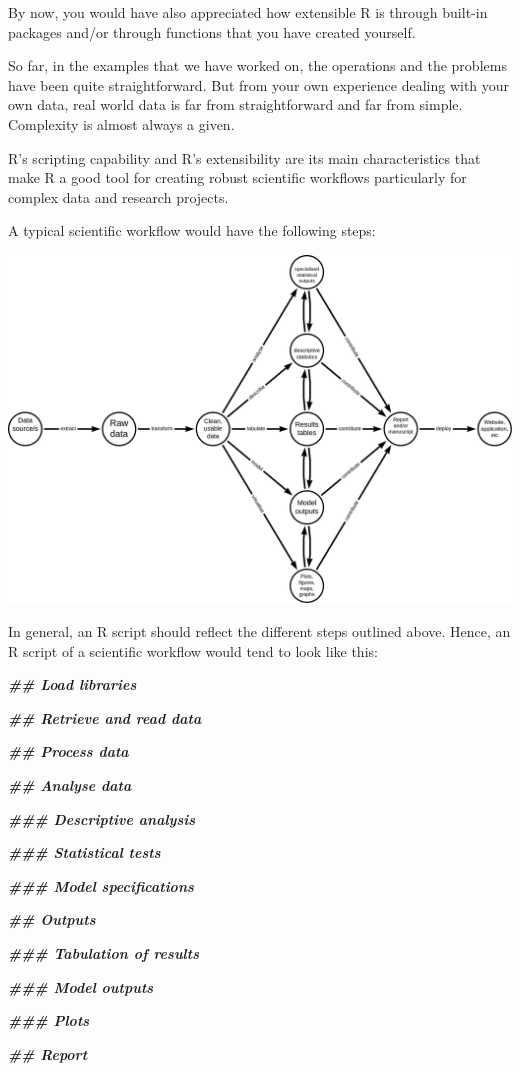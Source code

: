 \documentclass[
  12pt,
]{book}
\newenvironment{Shaded}{\begin{snugshade}}{\end{snugshade}}
\newcommand{\DocumentationTok}[1]{\textcolor[rgb]{0.56,0.35,0.01}{\textbf{\textit{#1}}}}
\begin{document}
By now, you would have also appreciated how extensible R is through built-in packages and/or through functions that you have created yourself.

So far, in the examples that we have worked on, the operations and the problems have been quite straightforward. But from your own experience dealing with your own data, real world data is far from straightforward and far from simple. Complexity is almost always a given.

R's scripting capability and R's extensibility are its main characteristics that make R a good tool for creating robust scientific workflows particularly for complex data and research projects.

A typical scientific workflow would have the following steps:

\begin{center}\includegraphics[width=21.96in]{images/scientific-workflow} \end{center}

In general, an R script should reflect the different steps outlined above. Hence, an R script of a scientific workflow would tend to look like this:

\begin{Shaded}
\begin{Highlighting}[]
\DocumentationTok{\#\# Load libraries}


\DocumentationTok{\#\# Retrieve and read data}


\DocumentationTok{\#\# Process data}


\DocumentationTok{\#\# Analyse data}

\DocumentationTok{\#\#\# Descriptive analysis}

\DocumentationTok{\#\#\# Statistical tests}

\DocumentationTok{\#\#\# Model specifications}


\DocumentationTok{\#\# Outputs}

\DocumentationTok{\#\#\# Tabulation of results}

\DocumentationTok{\#\#\# Model outputs}

\DocumentationTok{\#\#\# Plots}


\DocumentationTok{\#\# Report}

\end{Highlighting}
\end{Shaded}
\end{document}

